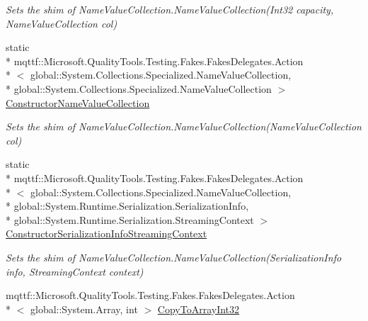 \begin{DoxyCompactItemize}
\begin{DoxyCompactList}\small\item\em Sets the shim of Name\-Value\-Collection.\-Name\-Value\-Collection(\-Int32 capacity, Name\-Value\-Collection col)\end{DoxyCompactList}\item 
static \\*
mqttf\-::\-Microsoft.\-Quality\-Tools.\-Testing.\-Fakes.\-Fakes\-Delegates.\-Action\\*
$<$ global\-::\-System.\-Collections.\-Specialized.\-Name\-Value\-Collection, \\*
global\-::\-System.\-Collections.\-Specialized.\-Name\-Value\-Collection $>$ \hyperlink{class_system_1_1_collections_1_1_specialized_1_1_fakes_1_1_shim_name_value_collection_ad2ed0c4cf0896940923a50109374d49e}{Constructor\-Name\-Value\-Collection}
\begin{DoxyCompactList}\small\item\em Sets the shim of Name\-Value\-Collection.\-Name\-Value\-Collection(\-Name\-Value\-Collection col)\end{DoxyCompactList}\item 
static \\*
mqttf\-::\-Microsoft.\-Quality\-Tools.\-Testing.\-Fakes.\-Fakes\-Delegates.\-Action\\*
$<$ global\-::\-System.\-Collections.\-Specialized.\-Name\-Value\-Collection, \\*
global\-::\-System.\-Runtime.\-Serialization.\-Serialization\-Info, \\*
global\-::\-System.\-Runtime.\-Serialization.\-Streaming\-Context $>$ \hyperlink{class_system_1_1_collections_1_1_specialized_1_1_fakes_1_1_shim_name_value_collection_a82ac246f897ae6d139cac54436b4c8be}{Constructor\-Serialization\-Info\-Streaming\-Context}
\begin{DoxyCompactList}\small\item\em Sets the shim of Name\-Value\-Collection.\-Name\-Value\-Collection(\-Serialization\-Info info, Streaming\-Context context)\end{DoxyCompactList}\item 
mqttf\-::\-Microsoft.\-Quality\-Tools.\-Testing.\-Fakes.\-Fakes\-Delegates.\-Action\\*
$<$ global\-::\-System.\-Array, int $>$ \hyperlink{class_system_1_1_collections_1_1_specialized_1_1_fakes_1_1_shim_name_value_collection_ac58f150113b3a2efcc42da85be269bd9}{Copy\-To\-Array\-Int32}

\end{DoxyCompactItemize}
